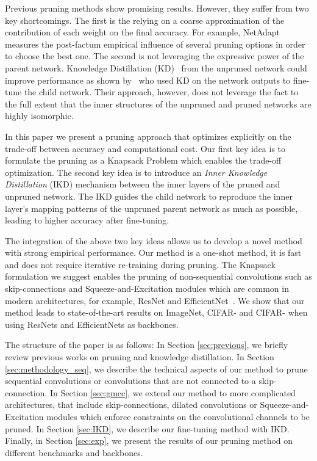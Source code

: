 \documentclass{article}
\begin{document}
Previous pruning methods show promising results. However, they suffer from two key shortcomings.
The first is the relying on a coarse approximation of the contribution of each weight on the final accuracy.
For example, NetAdapt~\cite{DBLP:conf/eccv/YangHCZGSSA18} measures the post-factum empirical influence of several pruning options in order to choose the best one.
The second is not leveraging the expressive power of the parent network. 
Knowledge Distillation (KD)~\cite{KnowledgeDistillation} from the unpruned network could improve performance as shown by~\cite{TAS} who used KD on the network outputs to fine-tune the child network. Their approach, however, does not leverage the fact to the full extent that the inner structures of the unpruned and pruned networks are highly isomorphic.

In this paper we present a pruning approach that optimizes explicitly on the trade-off between accuracy and computational cost.
Our first key idea is to formulate the pruning as a Knapsack Problem which enables the trade-off optimization.
The second key idea is to introduce an {\it Inner Knowledge Distillation} (IKD) mechanism between the inner layers of the pruned and unpruned network. The IKD guides the child network to reproduce the inner layer's mapping patterns of the unpruned parent network as much as possible, leading to higher accuracy after fine-tuning.

The integration of the above two key ideas allows us to develop a novel method with strong empirical performance.
Our method is a one-shot method, it is fast and does not require iterative re-training during pruning. 
The Knapsack formulation we suggest enables the pruning of non-sequential convolutions such as skip-connections and Squeeze-and-Excitation modules which are common in modern architectures, for example, ResNet and EfficientNet~\cite{EfficientNet}. We show that our method leads to state-of-the-art results on ImageNet, CIFAR- and CIFAR- when using ResNets and EfficientNets as backbones.  


The structure of the paper is as follows: In Section \ref{sec:previous}, we briefly review previous works on pruning and knowledge distillation. In Section \ref{sec:methodology_seq}, we describe the technical aspects of our method to prune sequential convolutions or convolutions that are not connected to a skip-connection. In Section \ref{sec:gmcc}, we extend our method to more complicated architectures, that include skip-connections, dilated convolutions or Squeeze-and-Excitation modules which enforce constraints on the convolutional channels to be pruned. In Section \ref{sec:IKD}, we describe our fine-tuning method with IKD. Finally, in Section \ref{sec:exp}, we present the results of our pruning method on different benchmarks and backbones.
\end{document}
